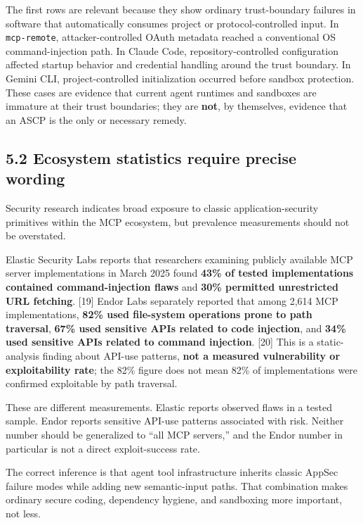 \documentclass[
  10pt,
  letterpaper,
]{article}
\begin{document}
The first rows are relevant because they show ordinary trust-boundary
failures in software that automatically consumes project or
protocol-controlled input. In \texttt{mcp-remote}, attacker-controlled
OAuth metadata reached a conventional OS command-injection path. In
Claude Code, repository-controlled configuration affected startup
behavior and credential handling around the trust boundary. In Gemini
CLI, project-controlled initialization occurred before sandbox
protection. These cases are evidence that current agent runtimes and
sandboxes are immature at their trust boundaries; they are \textbf{not},
by themselves, evidence that an ASCP is the only or necessary remedy.

\subsection{5.2 Ecosystem statistics require precise
wording}\label{ecosystem-statistics-require-precise-wording}

Security research indicates broad exposure to classic
application-security primitives within the MCP ecosystem, but prevalence
measurements should not be overstated.

Elastic Security Labs reports that researchers examining publicly
available MCP server implementations in March 2025 found \textbf{43\% of
tested implementations contained command-injection flaws} and
\textbf{30\% permitted unrestricted URL fetching}. {[}19{]} Endor Labs
separately reported that among 2,614 MCP implementations, \textbf{82\%
used file-system operations prone to path traversal}, \textbf{67\% used
sensitive APIs related to code injection}, and \textbf{34\% used
sensitive APIs related to command injection}. {[}20{]} This is a
static-analysis finding about API-use patterns, \textbf{not a measured
vulnerability or exploitability rate}; the 82\% figure does not mean
82\% of implementations were confirmed exploitable by path traversal.

These are different measurements. Elastic reports observed flaws in a
tested sample. Endor reports sensitive API-use patterns associated with
risk. Neither number should be generalized to ``all MCP servers,'' and
the Endor number in particular is not a direct exploit-success rate.

The correct inference is that agent tool infrastructure inherits classic
AppSec failure modes while adding new semantic-input paths. That
combination makes ordinary secure coding, dependency hygiene, and
sandboxing more important, not less.
\end{document}

